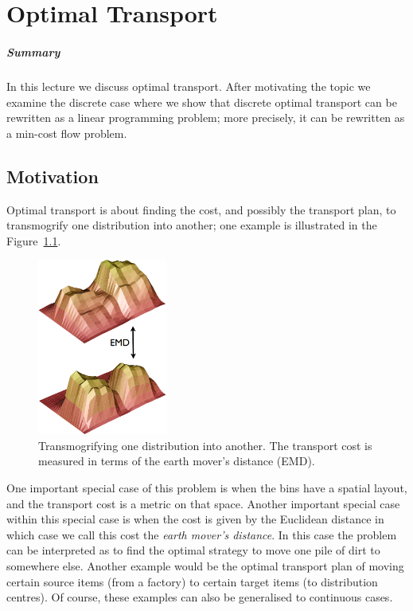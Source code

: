 \chapter{Optimal Transport}%
\label{chapter:11}

\paragraph{Summary}
In this lecture we discuss optimal transport. After motivating the topic we
examine the discrete case where we show that discrete optimal transport can be
rewritten as a linear programming problem; more precisely, it can be rewritten
as a min-cost flow problem.

\section{Motivation}
Optimal transport is about finding the cost, and possibly the transport plan, to
transmogrify one distribution into another; one example is illustrated in the
Figure~\ref{fig:emd}.

\begin{figure}
  \centering \includegraphics[width=0.38\textwidth]{Figures/emd}
  \caption{Transmogrifying one distribution into another. The transport cost is
    measured in terms of the earth mover's distance (EMD).}%
  \label{fig:emd}
\end{figure}

One important special case of this problem is when the bins have a spatial
layout, and the transport cost is a metric on that space. Another important
special case within this special case is when the cost is given by the Euclidean
distance in which case we call this cost the \emph{earth mover's distance}. In
this case the problem can be interpreted as to find the optimal strategy to move
one pile of dirt to somewhere else. Another example would be the optimal
transport plan of moving certain source items (\eg from a factory) to certain
target items (\eg to distribution centres). Of course, these examples can also
be generalised to continuous cases.

